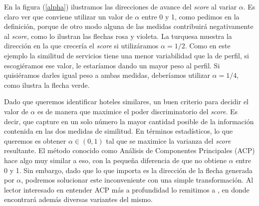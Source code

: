 \documentclass[12pt]{report}
\begin{document}
En la figura (\ref{alpha}) ilustramos las direcciones de avance del \emph{score} al variar $\alpha$. Es claro ver que conviene utilizar un valor de $\alpha$ entre 0 y 1, como pedimos en la definición, porque de otro modo alguna de las medidas contribuirá negativamente al \emph{score}, como lo ilustran las flechas rosa y violeta. La turquesa muestra la dirección en la que crecería el \emph{score} si utilizáramos $\alpha = 1/2$. Como en este ejemplo la similitud de servicios tiene una menor variabilidad que la de perfil, si escogiéramos ese valor, le estaríamos dando un mayor peso al perfil. Si quisiéramos darles igual peso a ambas medidas, deberíamos utilizar $\alpha = 1/4$, como ilustra la flecha verde.

Dado que queremos identificar hoteles similares, un buen criterio para decidir el valor de $\alpha$ es de manera que maximice el poder discriminatorio del \emph{score}. Es decir, que capture en un solo número la mayor cantidad posible de la información contenida en las dos medidas de similitud. En términos estadísticos, lo que queremos es obtener $\alpha \in (0,1)$ tal que se maximice la varianza del \emph{score} resultante. El método conocido como Análisis de Componentes Principales (ACP) hace algo muy similar a eso, con la pequeña diferencia de que no obtiene $\alpha$ entre 0 y 1. Sin embargo, dado que lo que importa es la dirección de la flecha generada por $\alpha$, podremos solucionar este inconveniente con una simple transformación. Al lector interesado en entender ACP más a profundidad lo remitimos a \cite{elements}, en donde encontrará además diversas variantes del mismo.
\end{document}
